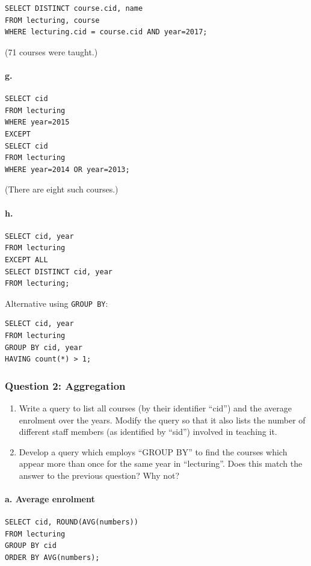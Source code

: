 \begin{verbatim}
SELECT DISTINCT course.cid, name
FROM lecturing, course
WHERE lecturing.cid = course.cid AND year=2017;
\end{verbatim}
(71 courses were taught.)

\paragraph{g.}
\begin{verbatim}
SELECT cid
FROM lecturing
WHERE year=2015
EXCEPT
SELECT cid
FROM lecturing
WHERE year=2014 OR year=2013;
\end{verbatim}
(There are eight such courses.)

\paragraph{h.}
\begin{verbatim}
SELECT cid, year
FROM lecturing
EXCEPT ALL
SELECT DISTINCT cid, year
FROM lecturing;
\end{verbatim}

Alternative using \texttt{GROUP BY}:
\begin{verbatim}
SELECT cid, year
FROM lecturing
GROUP BY cid, year
HAVING count(*) > 1;
\end{verbatim}

\subsubsection{Question 2: Aggregation}
\begin{enumerate}[label=\alph*)]
\item Write a query to list all courses (by their identifier ``cid'') and the average enrolment over the years. Modify the query so that it also lists the number of different staff members (as identified by ``sid'') involved in teaching it.

\item Develop a query which employs ``GROUP BY'' to find the courses which appear more than once for the same year in ``lecturing''. Does this match the answer to the previous question? Why not?
\end{enumerate}

\paragraph{a. Average enrolment}
\begin{verbatim}
SELECT cid, ROUND(AVG(numbers))
FROM lecturing
GROUP BY cid
ORDER BY AVG(numbers);
\end{verbatim}

